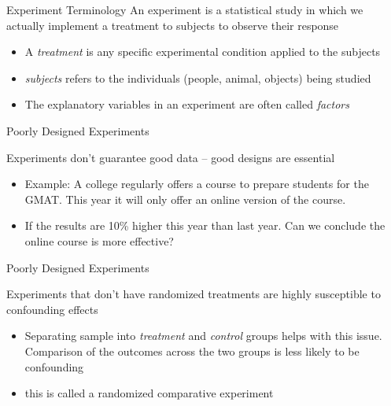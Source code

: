 \documentclass{beamer}
\begin{document}
\begin{frame}{Experiment Terminology}
	An \alert{experiment} is a statistical study in which we actually implement a \alert{treatment} to \alert{subjects} to observe their \alert{response}
	\begin{itemize}
		\item A \textit{treatment} is any specific experimental condition applied to the subjects
		\item \textit{subjects} refers to the individuals (people, animal, objects) being studied
		\item The explanatory variables in an experiment are often called \textit{factors}
	\end{itemize}
\end{frame}

\begin{frame}{Poorly Designed Experiments}
	
	Experiments don't guarantee good data -- good designs are essential
	\begin{itemize}
		\item Example: A college regularly offers a course to prepare students for the GMAT. This year it will only offer an online version of the course.
		      
		\item If the results are 10\% higher this year than last year. Can we conclude the online course is more effective?
	\end{itemize}
	
\end{frame}

\begin{frame}{Poorly Designed Experiments}
	
	Experiments that don't have \alert{randomized treatments} are highly susceptible to confounding effects
	\begin{itemize}
		\item Separating sample into \textit{treatment} and \textit{control} groups helps with this issue. Comparison of the outcomes across the two groups is less likely to be confounding
		      
		\item this is called a \alert{randomized comparative experiment}
	\end{itemize}
	
\end{frame}
\end{document}
